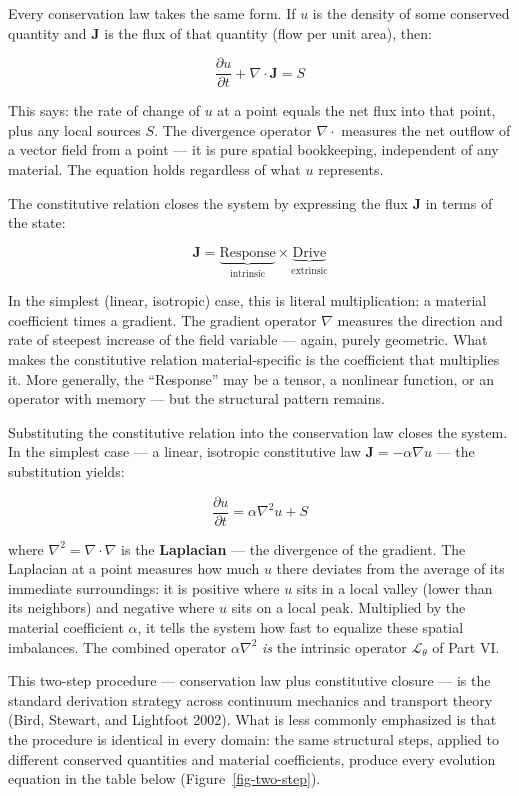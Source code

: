 \documentclass[
  letterpaper,
  DIV=11,
  numbers=noendperiod]{scrartcl}
\begin{document}
Every conservation law takes the same form. If \(u\) is the density of
some conserved quantity and \(\mathbf{J}\) is the flux of that quantity
(flow per unit area), then:

\[\frac{\partial u}{\partial t} + \nabla \cdot \mathbf{J} = S\]

This says: the rate of change of \(u\) at a point equals the net flux
into that point, plus any local sources \(S\). The divergence operator
\(\nabla \cdot\) measures the net outflow of a vector field from a point
--- it is pure spatial bookkeeping, independent of any material. The
equation holds regardless of what \(u\) represents.

The constitutive relation closes the system by expressing the flux
\(\mathbf{J}\) in terms of the state:

\[\mathbf{J} = \underbrace{\text{Response}}_{\text{intrinsic}} \times \underbrace{\text{Drive}}_{\text{extrinsic}}\]

In the simplest (linear, isotropic) case, this is literal
multiplication: a material coefficient times a gradient. The gradient
operator \(\nabla\) measures the direction and rate of steepest increase
of the field variable --- again, purely geometric. What makes the
constitutive relation material-specific is the coefficient that
multiplies it. More generally, the ``Response'' may be a tensor, a
nonlinear function, or an operator with memory --- but the structural
pattern remains.

Substituting the constitutive relation into the conservation law closes
the system. In the simplest case --- a linear, isotropic constitutive
law \(\mathbf{J} = -\alpha \nabla u\) --- the substitution yields:

\[\frac{\partial u}{\partial t} = \alpha \nabla^2 u + S\]

where \(\nabla^2 = \nabla \cdot \nabla\) is the \textbf{Laplacian} ---
the divergence of the gradient. The Laplacian at a point measures how
much \(u\) there deviates from the average of its immediate
surroundings: it is positive where \(u\) sits in a local valley (lower
than its neighbors) and negative where \(u\) sits on a local peak.
Multiplied by the material coefficient \(\alpha\), it tells the system
how fast to equalize these spatial imbalances. The combined operator
\(\alpha \nabla^2\) \emph{is} the intrinsic operator
\(\mathcal{L}_\theta\) of Part VI.

This two-step procedure --- conservation law plus constitutive closure
--- is the standard derivation strategy across continuum mechanics and
transport theory (Bird, Stewart, and Lightfoot 2002). What is less
commonly emphasized is that the procedure is identical in every domain:
the same structural steps, applied to different conserved quantities and
material coefficients, produce every evolution equation in the table
below (Figure~\ref{fig-two-step}).
\end{document}
